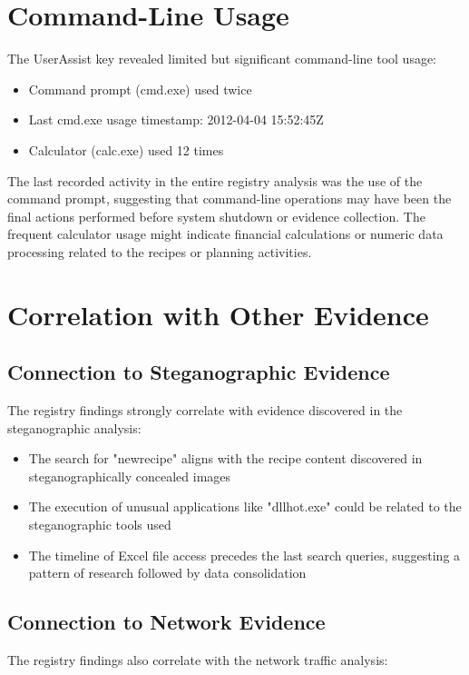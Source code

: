 \section{Command-Line Usage}
The UserAssist key revealed limited but significant command-line tool usage:

\begin{itemize}
    \item Command prompt (cmd.exe) used twice
    \item Last cmd.exe usage timestamp: 2012-04-04 15:52:45Z
    \item Calculator (calc.exe) used 12 times
\end{itemize}

The last recorded activity in the entire registry analysis was the use of the command prompt, suggesting that command-line operations may have been the final actions performed before system shutdown or evidence collection. The frequent calculator usage might indicate financial calculations or numeric data processing related to the recipes or planning activities.

\section{Correlation with Other Evidence}
\subsection{Connection to Steganographic Evidence}
The registry findings strongly correlate with evidence discovered in the steganographic analysis:

\begin{itemize}
    \item The search for "newrecipe" aligns with the recipe content discovered in steganographically concealed images
    \item The execution of unusual applications like "dllhot.exe" could be related to the steganographic tools used
    \item The timeline of Excel file access precedes the last search queries, suggesting a pattern of research followed by data consolidation
\end{itemize}

\subsection{Connection to Network Evidence}
The registry findings also correlate with the network traffic analysis:

